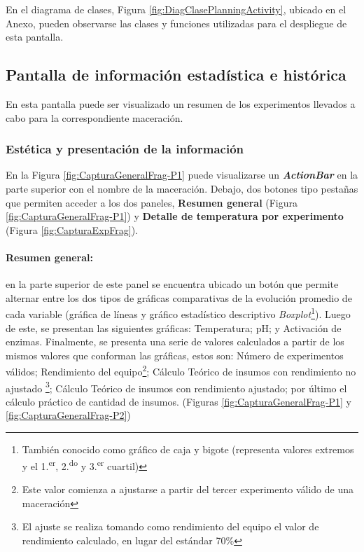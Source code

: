             \par En el diagrama de clases, Figura \ref{fig:DiagClasePlanningActivity}, ubicado en el Anexo, pueden observarse las clases y funciones utilizadas para el despliegue de esta pantalla.
            
            
        \subsection{Pantalla de información estadística e histórica}
        \label{DescripPantallaEstadística}
            \par En esta pantalla puede ser visualizado un resumen de los experimentos llevados a cabo para la correspondiente maceración.
        
            \subsubsection{Estética y presentación de la información}
            \par En la Figura \ref{fig:CapturaGeneralFrag-P1} puede visualizarse un \textbf{\textit{\gls{ActionBar}}} en la parte superior con el nombre de la maceración. Debajo, dos botones tipo pestañas que permiten acceder a los dos paneles, \textbf{Resumen general} (Figura \ref{fig:CapturaGeneralFrag-P1}) y \textbf{Detalle de temperatura por experimento} (Figura \ref{fig:CapturaExpFrag}). 
            
            \paragraph{Resumen general:} en la parte superior de este panel se encuentra ubicado un botón que permite alternar entre los dos tipos de gráficas comparativas de la evolución promedio de cada variable (gráfica de líneas y gráfico estadístico descriptivo \textit{Boxplot}\footnote{También conocido como gráfico de caja y bigote (representa valores extremos y el 1.\textsuperscript{er}, 2.\textsuperscript{do} y 3.\textsuperscript{er} cuartil)}). Luego de este, se presentan las siguientes gráficas: Temperatura; pH; y Activación de enzimas. Finalmente, se presenta una serie de valores calculados a partir de los mismos valores que conforman las gráficas, estos son: Número de experimentos válidos; Rendimiento del equipo\footnote{Este valor comienza a ajustarse a partir del tercer experimento válido de una maceración}; Cálculo Teórico de insumos con rendimiento no ajustado \footnote{El ajuste se realiza tomando como rendimiento del equipo el valor de rendimiento calculado, en lugar del estándar 70\%}; Cálculo Teórico de insumos con rendimiento ajustado; por último el cálculo práctico de cantidad de insumos. (Figuras \ref{fig:CapturaGeneralFrag-P1} y \ref{fig:CapturaGeneralFrag-P2}) 
            
